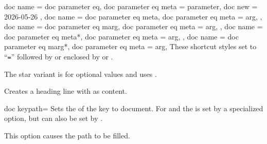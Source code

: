 \clearpage

\begin{docTcbKeys}[doc description = style]
  {
    {
      doc name = doc parameter eq,
      doc parameter eq meta = parameter,
      doc new  = 2026-05-26
    },
    {
      doc name = doc parameter eq meta,
      doc parameter eq meta = arg,
    },
    {
      doc name = doc parameter eq marg,
      doc parameter eq meta = arg,
    },
    {
      doc name = doc parameter eq meta*,
      doc parameter eq meta = arg,
    },
    {
      doc name = doc parameter eq marg*,
      doc parameter eq meta = arg,
    }
  }
These shortcut styles set  to \enquote{\texttt{=}}
followed by  or  enclosed by  or .\par
The star variant is for optional values and uses .


\begin{dispExample}
\begin{docKeys}[
    doc name              = /foo/footitle,
    doc parameter eq meta = text,
    doc description init empty
  ]{}
  Creates a heading line with  as content.
\end{docKeys}
\end{dispExample}
\end{docTcbKeys}


\begin{docTcbKey}[][doc new={2020-04-22}]{doc keypath}{=}{\tcbdocdescInitEmpty}
  Sets the  of the key to document. For 
  and  the   is set by a specialized option,
  but can also be set by .
\begin{dispExample}
\begin{docKeys}[
    doc no index,  %
    doc keypath            = tikz,
    doc name               = fill,
    doc parameter eq meta* = color,
    doc description        = default is scope's color setting,
  ] {}
  This option causes the path to be filled.
\end{docKeys}
\end{dispExample}
\end{docTcbKey}

\clearpage

